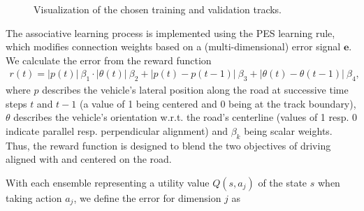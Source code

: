 \begin{figure}[t!]
\centering
{}
\hspace{1cm}
\caption{Visualization of the chosen training and validation tracks.}
\label{fig:tracks}
\end{figure}
The associative learning process is implemented using the \ac{PES} \cite{Bekolay2013} learning rule, which modifies connection weights based on a (multi-dimensional) error signal $\textbf{e}$.
We calculate the error from the reward function
\begin{align}
r(t) = \lvert p(t) \rvert~\beta_1 \cdot \lvert \theta(t) \rvert ~ \beta_2+ \lvert p(t)-p(t-1) \rvert ~ \beta_3+ \lvert \theta(t)-\theta(t-1) \rvert ~ \beta_4 \text{,}
\label{eq:reward}
\end{align}
where $p$ describes the vehicle's lateral position along the road at successive time steps $t$ and $t-1$ (a value of \num{1} being centered and \num{0} being at the track boundary), $\theta$ describes the vehicle's orientation w.r.t. the road's centerline (values of \num{1} resp. \num{0} indicate parallel resp. perpendicular alignment) and $\beta_k$ being scalar weights.
Thus, the reward function is designed to blend the two objectives of driving aligned with and centered on the road.

With each ensemble representing a utility value $Q(s,a_j)$ of the state $s$  when taking action $a_j$, we define the error for dimension $j$ as


